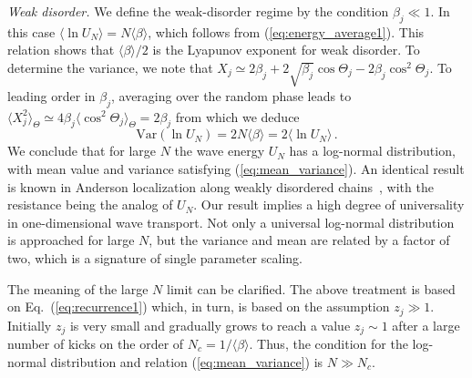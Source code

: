 \documentclass[ prl, twocolumn, superscriptaddress, amsfonts, amsmath,floatfix]{revtex4-1}
\begin{document}
{\it Weak disorder.}
We define the weak-disorder regime by the condition $\beta_j \ll 1$. In this case $\langle \ln U_N \rangle = N \langle \beta \rangle$, which follows from (\ref{eq:energy_average1}). This relation shows that $\langle \beta \rangle/2$ is the Lyapunov exponent for weak disorder. To determine the variance, we note that 
$X_j \simeq 2 \beta_j + 2 \sqrt{\beta_j} \cos \Theta_j - 2 \beta_j \cos^2\Theta_j$.
To leading order in $\beta_j$, averaging over the random phase leads to
$\langle X_j^2 \rangle_\Theta \simeq 4 \beta_j \langle \cos^2 \Theta_j \rangle_\Theta = 2 \beta_j$
from which we deduce
\begin{equation}
\mathrm{Var}(\ln U_N) = 2 N \langle \beta \rangle = 2 \langle \ln U_N \rangle \, .
\label{eq:mean_variance}
\end{equation}
We conclude that for large $N$ the wave energy $U_N$ has a log-normal distribution, with mean value and variance satisfying (\ref{eq:mean_variance}). An identical result is known in Anderson localization along weakly disordered chains~\cite{Shapiro1988}, with the resistance being the analog of $U_N$. Our result implies a high degree of universality in one-dimensional wave transport. Not only a universal log-normal distribution is approached for large $N$, but the variance and mean are related by a factor of two, which is a signature of  single parameter scaling.  

The meaning of the large $N$ limit can be clarified. The above treatment is based on Eq.~(\ref{eq:recurrence1}) which, in turn, is based on the assumption $z_j \gg 1$. Initially $z_j$ is very small and gradually grows to reach a value $z_j \sim 1$ after a large number of kicks on the order of $N_c = 1/\langle \beta \rangle$. Thus, the condition for the log-normal distribution and relation (\ref{eq:mean_variance}) is $N \gg N_c$. 
\end{document}
